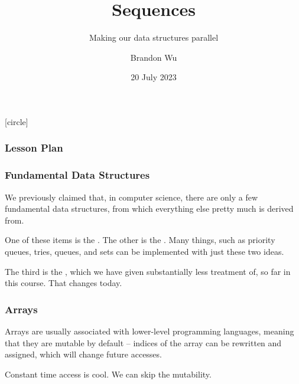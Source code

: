 \documentclass[aspectratio=169, handout]{beamer}
\title{Sequences} %
\subtitle{Making our data structures parallel} %
\date{20 July 2023} %
\author{Brandon Wu} %
\newif\ifcolorlambda
\begin{document}
\ifweb
    \renewcommand{\pause}{}
\fi

[circle]

{
\begin{frame}[plain]
    \colorlambdatrue
    \titlepage
\end{frame}
}


\begin{frame}[fragile]
  \frametitle{Lesson Plan}

  \tableofcontents
\end{frame}


\begin{frame}[fragile]
  \frametitle{Fundamental Data Structures}

  We previously claimed that, in computer science, there are only a few
  fundamental data structures, from which everything else pretty much
  is derived from.

  \pause
  \vspace{\fill}

  One of these items is the . The other is the . Many
  things, such as priority queues, tries, queues, and sets can be implemented
  with just these two ideas.

  \pause
  \vspace{\fill}

  The third is the , which we have given substantially less
  treatment of, so far in this course. That changes today.
\end{frame}

\begin{frame}[fragile]
  \frametitle{Arrays}


  \pause
  \vspace{\fill}

  Arrays are usually associated with lower-level programming languages, meaning
  that they are mutable by default -- indices of the array can be rewritten and
  assigned, which will change future accesses.

  \pause
  \vspace{\fill}

  Constant time access is cool. We can skip the mutability.
\end{frame}
\end{document}
